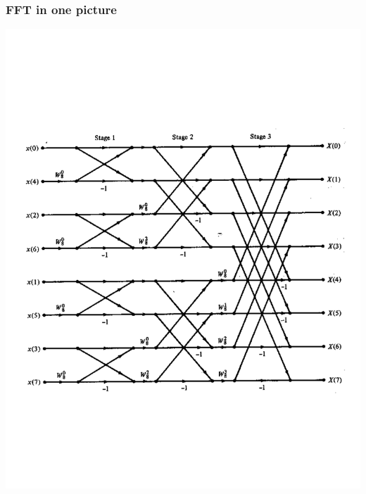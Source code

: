 \documentclass[mathserif,9pt,handout]{beamer}
\begin{document}
\begin{frame}\frametitle{FFT in one picture}\small
  \begin{center}
    \includegraphics[height=\textheight]{fft.pdf}
  \end{center}
\end{frame}
\end{document}
